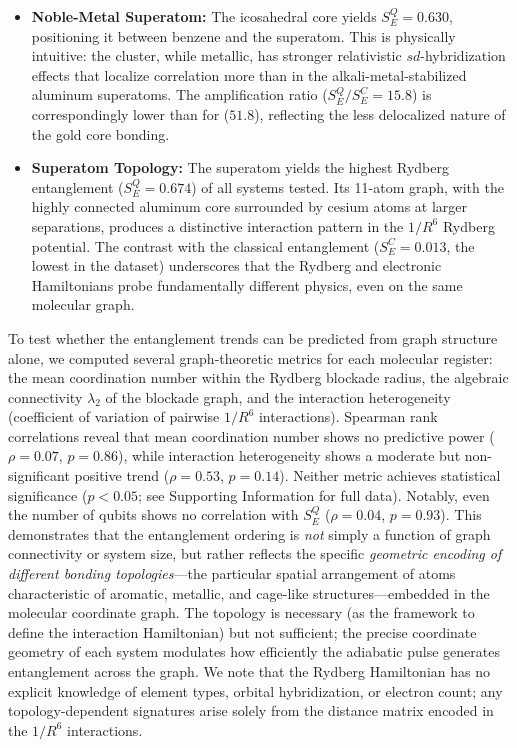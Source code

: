 \documentclass[12pt,a4paper]{article}
\begin{document}
\begin{itemize}
    \item \textbf{Noble-Metal Superatom:} The  icosahedral core yields
    $S_E^Q = 0.630$, positioning it between benzene and the  superatom.
    This is physically intuitive: the  cluster, while metallic, has stronger
    relativistic $sd$-hybridization effects that localize correlation more than in the
    alkali-metal-stabilized aluminum superatoms. The amplification ratio
    ($S_E^Q/S_E^C = 15.8$) is correspondingly lower than for  ($51.8$),
    reflecting the less delocalized nature of the gold core bonding.

    \item \textbf{Superatom Topology:} The  superatom yields the
    highest Rydberg entanglement ($S_E^{Q} = 0.674$) of all systems tested.
    Its 11-atom graph, with the highly connected aluminum core surrounded by
    cesium atoms at larger separations, produces a distinctive interaction
    pattern in the $1/R^6$ Rydberg potential. The contrast with the
    classical entanglement ($S_E^C = 0.013$, the lowest in the dataset)
    underscores that the Rydberg and electronic Hamiltonians probe
    fundamentally different physics, even on the same molecular graph.
\end{itemize}

To test whether the entanglement trends can be predicted from graph
structure alone, we computed several graph-theoretic metrics for each
molecular register: the mean coordination number within the Rydberg
blockade radius, the algebraic connectivity $\lambda_2$ of the
blockade graph, and the interaction heterogeneity (coefficient of
variation of pairwise $1/R^6$ interactions). Spearman rank
correlations reveal that mean coordination number shows no predictive
power ($\rho = 0.07$, $p = 0.86$), while interaction heterogeneity
shows a moderate but non-significant positive trend ($\rho = 0.53$,
$p = 0.14$). Neither metric achieves statistical significance
($p < 0.05$; see Supporting Information for full data). Notably, even
the number of qubits shows no correlation with $S_E^Q$
($\rho = 0.04$, $p = 0.93$).
This demonstrates that the entanglement ordering is \emph{not} simply
a function of graph connectivity or system size, but rather reflects
the specific \emph{geometric encoding of different bonding topologies}---the
particular spatial arrangement of atoms characteristic of aromatic, metallic,
and cage-like structures---embedded in the molecular coordinate graph.
The topology is necessary (as the
framework to define the interaction Hamiltonian) but not sufficient;
the precise coordinate geometry of each system modulates how efficiently the
adiabatic pulse generates entanglement across the graph.
We note that the Rydberg Hamiltonian has no explicit knowledge of
element types, orbital hybridization, or electron count; any
topology-dependent signatures arise solely from the distance matrix
encoded in the $1/R^6$ interactions.
\end{document}

